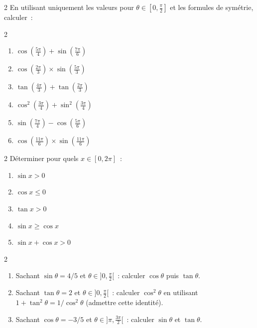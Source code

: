 \begin{exo}{2}
En utilisant uniquement les valeurs pour $\theta\in[0,\frac{\pi}{2}]$
et les formules de sym\'etrie, calculer~:
\begin{multicols}{2}
\begin{enumerate}
  \item $\cos(\frac{5\pi}{4})+\sin(\frac{7\pi}{6})$
  \item $\cos(\frac{2\pi}{3})\times\sin(\frac{5\pi}{3})$
  \item $\tan(\frac{4\pi}{3})+\tan(\frac{2\pi}{3})$
  \item $\cos^2(\frac{3\pi}{4})+\sin^2(\frac{3\pi}{4})$
  \item $\sin(\frac{7\pi}{4})-\cos(\frac{5\pi}{6})$
  \item $\cos(\frac{11\pi}{6})\times\sin(\frac{11\pi}{6})$
\end{enumerate}
\end{multicols}
\end{exo}

\begin{exo}{2}
D\'eterminer pour quels $x\in[0,2\pi]$~:
\begin{enumerate}
  \item $\sin x > 0$
  \item $\cos x \leq 0$
  \item $\tan x > 0$
  \item $\sin x \geq \cos x$
  \item $\sin x + \cos x > 0$
\end{enumerate}
\end{exo}

\begin{exo}{2}
\begin{enumerate}
  \item Sachant $\sin\theta=4/5$ et $\theta\in]0,\frac{\pi}{2}[$~:
        calculer $\cos\theta$ puis $\tan\theta$.
  \item Sachant $\tan\theta=2$ et $\theta\in]0,\frac{\pi}{2}[$~:
        calculer $\cos^2\theta$ en utilisant
        $1+\tan^2\theta = 1/\cos^2\theta$ (admettre cette identit\'e).
  \item Sachant $\cos\theta=-3/5$ et $\theta\in]\pi,\frac{3\pi}{2}[$~:
        calculer $\sin\theta$ et $\tan\theta$.
\end{enumerate}
\end{exo}

